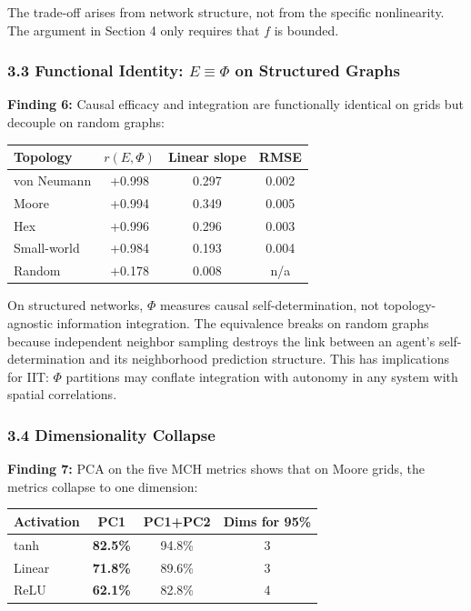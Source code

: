 \documentclass[
  11pt,
]{article}
\begin{document}
The trade-off arises from network structure, not from the specific
nonlinearity. The argument in Section 4 only requires that \(f\) is
bounded.

\subsubsection{\texorpdfstring{3.3 Functional Identity:
\(E \equiv \Phi\) on Structured
Graphs}{3.3 Functional Identity: E \textbackslash equiv \textbackslash Phi on Structured Graphs}}\label{functional-identity-e-equiv-phi-on-structured-graphs}

\textbf{Finding 6:} Causal efficacy and integration are functionally
identical on grids but decouple on random graphs:

\begin{longtable}[]{@{}lccc@{}}
\toprule\noalign{}
Topology & \(r(E, \Phi)\) & Linear slope & RMSE \\
\midrule\noalign{}
\endhead
\bottomrule\noalign{}
\endlastfoot
von Neumann & +0.998 & 0.297 & 0.002 \\
Moore & +0.994 & 0.349 & 0.005 \\
Hex & +0.996 & 0.296 & 0.003 \\
Small-world & +0.984 & 0.193 & 0.004 \\
Random & +0.178 & 0.008 & n/a \\
\end{longtable}

On structured networks, \(\Phi\) measures causal self-determination, not
topology-agnostic information integration. The equivalence breaks on
random graphs because independent neighbor sampling destroys the link
between an agent's self-determination and its neighborhood prediction
structure. This has implications for IIT: \(\Phi\) partitions may
conflate integration with autonomy in any system with spatial
correlations.

\subsubsection{3.4 Dimensionality
Collapse}\label{dimensionality-collapse}

\textbf{Finding 7:} PCA on the five MCH metrics shows that on Moore
grids, the metrics collapse to one dimension:

\begin{longtable}[]{@{}lccc@{}}
\toprule\noalign{}
Activation & PC1 & PC1+PC2 & Dims for 95\% \\
\midrule\noalign{}
\endhead
\bottomrule\noalign{}
\endlastfoot
tanh & \textbf{82.5\%} & 94.8\% & 3 \\
Linear & \textbf{71.8\%} & 89.6\% & 3 \\
ReLU & \textbf{62.1\%} & 82.8\% & 4 \\
\end{longtable}
\end{document}
